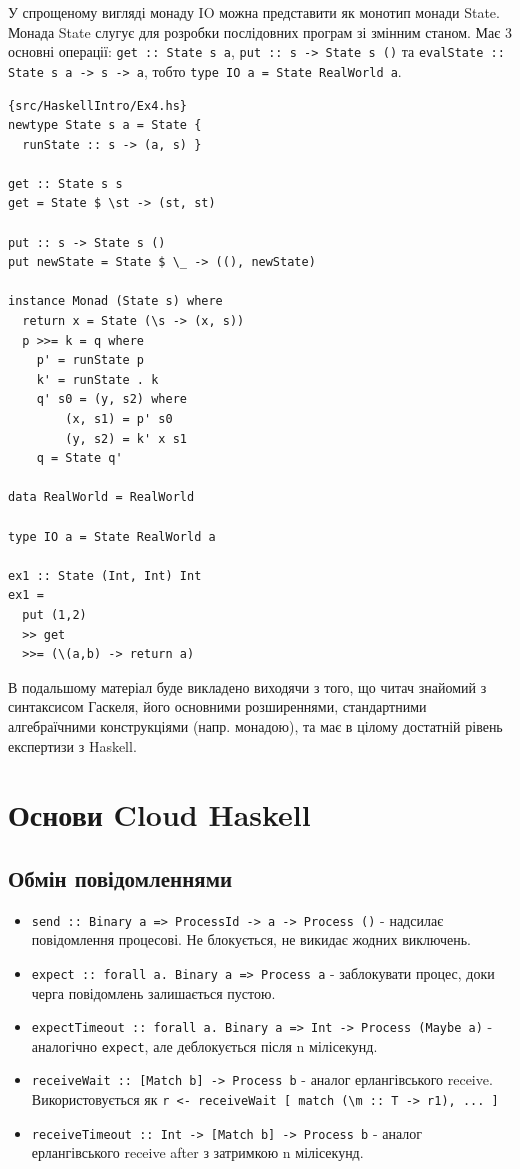 \documentclass[12pt]{article}
\begin{document}
У спрощеному вигляді монаду IO можна представити як монотип монади State. Монада State слугує для розробки послідовних програм зі змінним станом. Має 3 основні операції: \lstinline{get :: State s a}, \lstinline{put :: s -> State s ()} та \lstinline{evalState :: State s a -> s -> a}, тобто \lstinline{type IO a = State RealWorld a}. 

\begin{lstlisting}{src/HaskellIntro/Ex4.hs}
newtype State s a = State { 
  runState :: s -> (a, s) }

get :: State s s
get = State $ \st -> (st, st)

put :: s -> State s ()
put newState = State $ \_ -> ((), newState)

instance Monad (State s) where
  return x = State (\s -> (x, s))
  p >>= k = q where
    p' = runState p 
    k' = runState . k
    q' s0 = (y, s2) where
        (x, s1) = p' s0
        (y, s2) = k' x s1
    q = State q'

data RealWorld = RealWorld

type IO a = State RealWorld a

ex1 :: State (Int, Int) Int
ex1 =
  put (1,2)
  >> get
  >>= (\(a,b) -> return a)
\end{lstlisting}

В подальшому матеріал буде викладено виходячи з того, що читач знайомий з синтаксисом Гаскеля, його основними 
розширеннями, стандартними алгебраїчними конструкціями (напр. монадою), та має в цілому достатній рівень 
експертизи з Haskell.\\


\section{Основи Cloud Haskell}

\subsection{Обмін повідомленнями}

\begin{itemize}
    \item \lstinline{send :: Binary a => ProcessId -> a -> Process ()} - надсилає повідомлення процесові. Не блокується, не викидає жодних виключень.
    \item \lstinline{expect :: forall a. Binary a => Process a} - заблокувати процес, доки черга повідомлень залишається пустою.
    \item \lstinline{expectTimeout :: forall a. Binary a => Int -> Process (Maybe a)} - аналогічно \lstinline{expect}, але деблокується після n мілісекунд.
    \item \lstinline{receiveWait :: [Match b] -> Process b} - аналог ерлангівського receive. Використовується як \lstinline{r <- receiveWait [ match (\m :: T -> r1), ... ]}
    \item \lstinline{receiveTimeout :: Int -> [Match b] -> Process b} - аналог ерлангівського receive after з затримкою n мілісекунд. 
    
\end{itemize}
\end{document}
